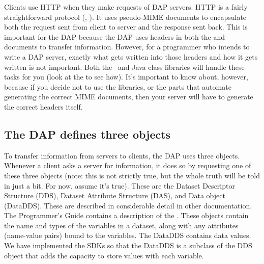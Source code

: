 \documentclass{dods-paper}
\begin{document}
Clients use HTTP when they make requests of DAP servers. HTTP is a fairly
straightforward protocol (, ).
It uses pseudo-MIME documents to encapsulate both the request sent from
client to server and the response sent back. This is important for the DAP
because the DAP uses headers in both the 
and 
documents to transfer information. However, for a programmer who intends to
write a DAP server, exactly what gets written into those headers and how it
gets written is not important. Both the \Cpp\ and Java class libraries will
handle these tasks for you (look at the 
to see how). It's important to know about, however, because if you decide not
to use the libraries, or the parts that automate generating the correct MIME
documents, then your server will have to generate the correct headers itself.

\subsection{The DAP defines three objects}

To transfer information from servers to clients, the DAP uses three objects.
Whenever a client asks a server for information, it does so by requesting one
of these three objects (note: this is not strictly true, but the whole truth
will be told in just a bit. For now, assume it's true). These are the Dataset
Descriptor Structure (DDS), Dataset Attribute Structure (DAS), and Data
object (DataDDS). These are described in considerable detail in other
documentation. The Programmer's Guide contains a description of the
.
These objects contain the name and types of the variables in a dataset, along
with any attributes (name-value pairs) bound to the variables. The DataDDS
contains data values. We have implemented the SDKs so that the DataDDS is a
subclass of the DDS object that adds the capacity to store values with each
variable.
\end{document}
